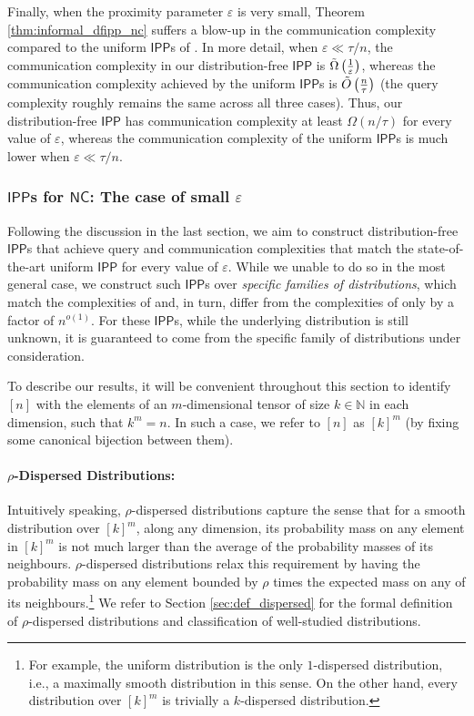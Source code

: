 \documentclass[10pt,a4paper]{article}
\newcommand{\NC}{\mathsf{NC}}
\newcommand{\IPP}{\mathsf{IPP}}
\newcommand{\N}{\mathbb{N}}
\newcommand{\eps}{\varepsilon}
\begin{document}
Finally, when the proximity parameter $\varepsilon$ is very small, Theorem \ref{thm:informal_dfipp_nc} suffers a blow-up in the communication complexity compared to the uniform $\IPP$s of \cite{RVW,RR20_batch_polylog}. In more detail, when $\varepsilon \ll \tau/n$, the communication complexity in our distribution-free $\IPP$ is $\Tilde{\Omega}\left(\frac{1}{\eps}\right)$, whereas the communication complexity achieved by the uniform $\IPP$s is $\Tilde{O}\left(\frac{n}{\tau}\right)$ (the query complexity roughly remains the same across all three cases). Thus, our distribution-free $\IPP$ has communication complexity at least $\Omega(n/\tau)$ for every value of $\varepsilon$, whereas the communication complexity of the uniform $\IPP$s is much lower when $\varepsilon \ll \tau/n$.

\subsubsection{$\IPP$s for $\NC$: The case of small $\varepsilon$}
Following the discussion in the last section, we aim to construct distribution-free $\IPP$s that achieve query and communication complexities that match the state-of-the-art uniform $\IPP$ for every value of $\varepsilon$. While we unable to do so in the most general case, we construct such $\IPP$s over \textit{specific families of distributions}, which match the complexities of \cite{RVW} and, in turn, differ from the complexities of \cite{RR20_batch_polylog} only by a factor of $n^{o(1)}$. For these $\IPP$s, while the underlying distribution is still unknown, it is guaranteed to come from the specific family of distributions under consideration.

To describe our results, it will be convenient throughout this section to identify $[n]$ with the elements of an $m$-dimensional tensor of size $k \in \N$ in each dimension, such that $k^m = n$. In such a case, we refer to $[n]$ as $[k]^m$ (by fixing some canonical bijection between them).

\paragraph*{$\rho$-Dispersed Distributions:}  Intuitively speaking, $\rho$-dispersed distributions capture the sense that for a smooth distribution over $[k]^m$, along any dimension, its probability mass on any element in $[k]^m$ is not much larger than the average of the probability masses of its neighbours. $\rho$-dispersed distributions relax this requirement by having the probability mass on any element bounded by $\rho$ times the expected mass on any of its neighbours.\footnote{For example, the uniform distribution is the only $1$-dispersed distribution, i.e., a maximally smooth distribution in this sense. On the other hand, every distribution over $[k]^m$ is trivially a $k$-dispersed distribution.} We refer to Section \ref{sec:def_dispersed} for the formal definition of $\rho$-dispersed distributions and classification of well-studied distributions.
\end{document}
